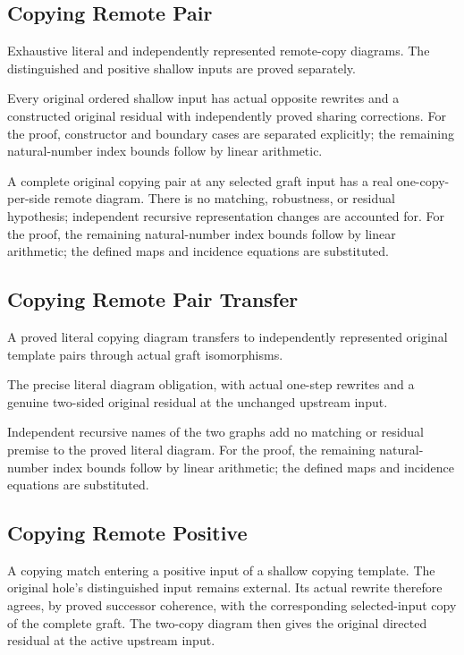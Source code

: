 \subsection{Copying Remote Pair}
Exhaustive literal and independently represented remote-copy diagrams. The distinguished and positive shallow inputs are proved separately.

Every original ordered shallow input has actual opposite rewrites and a constructed original residual with independently proved sharing corrections.
For the proof, constructor and boundary cases are separated explicitly; the remaining natural-number index bounds follow by linear arithmetic.
\par{}

A complete original copying pair at any selected graft input has a real one-copy-per-side remote diagram. There is no matching, robustness, or residual hypothesis; independent recursive representation changes are accounted for.
For the proof, the remaining natural-number index bounds follow by linear arithmetic; the defined maps and incidence equations are substituted.
\par{}

\subsection{Copying Remote Pair Transfer}
A proved literal copying diagram transfers to independently represented original template pairs through actual graft isomorphisms.

The precise literal diagram obligation, with actual one-step rewrites and a genuine two-sided original residual at the unchanged upstream input.
\par{}

Independent recursive names of the two graphs add no matching or residual premise to the proved literal diagram.
For the proof, the remaining natural-number index bounds follow by linear arithmetic; the defined maps and incidence equations are substituted.
\par{}

\subsection{Copying Remote Positive}
A copying match entering a positive input of a shallow copying template. The original hole's distinguished input remains external. Its actual rewrite therefore agrees, by proved successor coherence, with the corresponding selected-input copy of the complete graft. The two-copy diagram then gives the original directed residual at the active upstream input.

